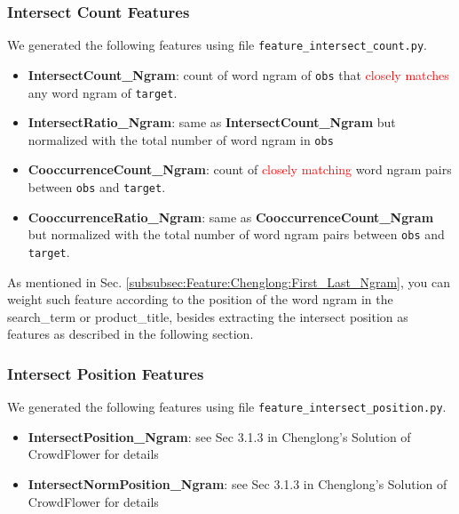 \documentclass[12pt]{article}
\begin{document}
{{\subsubsection{Intersect Count Features}
We generated the following features using file \texttt{feature\_intersect\_count.py}.
\begin{itemize}
\item \textbf{IntersectCount\_Ngram}: count of word ngram of \texttt{obs} that \textcolor{red}{closely matches} any word ngram of \texttt{target}.
\item \textbf{IntersectRatio\_Ngram}: same as \textbf{IntersectCount\_Ngram} but normalized with the total number of word ngram in \texttt{obs}
\item \textbf{CooccurrenceCount\_Ngram}: count of \textcolor{red}{closely matching} word ngram pairs between \texttt{obs} and \texttt{target}.
\item \textbf{CooccurrenceRatio\_Ngram}: same as \textbf{CooccurrenceCount\_Ngram} but normalized with the total number of word ngram pairs between \texttt{obs} and \texttt{target}.
\end{itemize}
As mentioned in Sec. \ref{subsubsec:Feature:Chenglong:First_Last_Ngram}, you can weight such feature according to the position of the word ngram in the search\_term or product\_title, besides extracting the intersect position as features as described in the following section.

\subsubsection{Intersect Position Features}
We generated the following features using file \texttt{feature\_intersect\_position.py}.
\begin{itemize}
\item \textbf{IntersectPosition\_Ngram}: see Sec 3.1.3 in Chenglong's Solution of CrowdFlower for details
\item \textbf{IntersectNormPosition\_Ngram}: see Sec 3.1.3 in Chenglong's Solution of CrowdFlower\cite{CrowdFlower_1st} for details
\end{itemize}

}}
\end{document}
